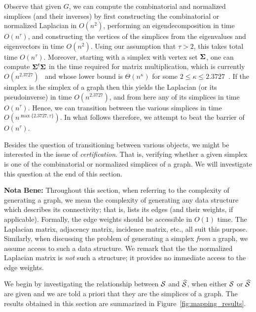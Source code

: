 Observe that given $G$, we can compute the combinatorial and normalized simplices (and their inverses) by first constructing the combinatorial or normalized Laplacian in $O(n^2)$, performing an eigendecomposition in time $O(n^\tau)$, and constructing the vertices of the simplices from the eigenvalues and eigenvectors in time $O(n^2)$. Using our  assumption that $\tau>2$, this takes total time $O(n^\tau)$.  Moreover, starting with a simplex with vertex set $\boldsymbol{\Sigma}$, one can compute $\boldsymbol{\Sigma}^t\boldsymbol{\Sigma}$ in the time required for matrix multiplication, which is currently $O(n^{2.3727})$~\cite{williams2012multiplying} and whose lower bound is $\Theta(n^\kappa)$ for some $2\leq \kappa\leq 2.3727$~\cite{stothers2010complexity}. If the simplex is the simplex of a graph then this yields the Laplacian (or its pseudoinverse) in time $O(n^{2.3727})$,  and from here any of its simplices  in time $O(n^\tau)$. Hence, we can transition between the various simplices in time $O(n^{\max\{2.3727,\tau\}})$.  In what follows therefore, we attempt to beat the barrier of $O(n^\tau)$. 

Besides  the question  of transitioning between various objects, we might be interested in the issue of \emph{certification}. That is, verifying whether  a given simplex is one of the combinatorial or normalized simplices of a graph. We will investigate  this question at  the end of this  section. 

\textbf{Nota Bene:} Throughout this section, when referring to the complexity  of generating a graph, we mean the complexity of generating any data structure which describes its connectivity; that is,  lists its  edges (and their weights, if applicable). Formally, the edge weights should be accessible  in $O(1)$ time. The Laplacian matrix,  adjacency matrix, incidence matrix,  etc.,  all suit this  purpose.  Similarly, when discussing the problem of  generating a simplex \emph{from} a graph,  we assume access to such a data structure. We remark that the the normalized Laplacian matrix is \emph{not} such a structure; it  provides no  immediate  access to the  edge weights.

We begin by investigating the relationship between $\mathcal{S}$ and $\widehat{\mathcal{S}}$, when either  $\mathcal{S}$ or $\widehat{\mathcal{S}}$ are given and we are told a priori that they are the simplices of a graph. The results obtained  in this section are summarized in Figure~\ref{fig:mapping_results}. 

